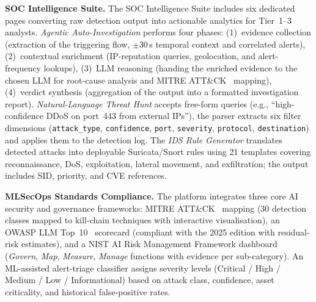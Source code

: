 \noindent\textbf{SOC Intelligence Suite.} The SOC Intelligence Suite includes six dedicated pages converting raw detection output into actionable analytics for Tier~1--3 analysts. \emph{Agentic Auto-Investigation} performs four phases: (1)~evidence collection (extraction of the triggering flow, $\pm$30\,s temporal context and correlated alerts), (2)~contextual enrichment (IP-reputation queries, geolocation, and alert-frequency lookups), (3)~LLM reasoning (handing the enriched evidence to the chosen LLM for root-cause analysis and MITRE ATT\&CK~\cite{Hernandez2015} mapping), (4)~verdict synthesis (aggregation of the output into a formatted investigation report). \emph{Natural-Language Threat Hunt} accepts free-form queries (e.g., ``high-confidence DDoS on port~443 from external IPs''), the parser extracts six filter dimensions (\texttt{attack\_type}, \texttt{confidence}, \texttt{port}, \texttt{severity}, \texttt{protocol}, \texttt{destination}) and applies them to the detection log. The \emph{IDS Rule Generator} translates detected attacks into deployable Suricata/Snort rules using 21 templates covering reconnaissance, DoS, exploitation, lateral movement, and exfiltration; the output includes SID, priority, and CVE references.

\noindent\textbf{MLSecOps Standards Compliance.} The platform integrates three core AI security and governance frameworks: MITRE ATT\&CK~\cite{Hernandez2015} mapping (30 detection classes mapped to kill-chain techniques with interactive visualisation), an OWASP LLM Top~10~\cite{Xiong2020} scorecard (compliant with the 2025 edition with residual-risk estimates), and a NIST AI Risk Management Framework dashboard (\emph{Govern}, \emph{Map}, \emph{Measure}, \emph{Manage} functions with evidence per sub-category). An ML-assisted alert-triage classifier assigns severity levels (Critical / High / Medium / Low / Informational) based on attack class, confidence, asset criticality, and historical false-positive rates.

